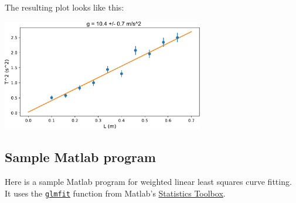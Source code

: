 \documentclass[11pt,a4paper]{article}
\begin{document}
The resulting plot looks like this:
\begin{center}
  \includegraphics[width=0.66\textwidth]{errorpy.pdf}
\end{center}

\subsection{Sample Matlab program}

Here is a sample Matlab program for weighted linear least squares
curve fitting.  It uses the
\href{https://www.mathworks.com/help/stats/glmfit.html}{\texttt{glmfit}}
function from Matlab's
\href{https://www.mathworks.com/help/stats/index.html}{Statistics
  Toolbox}.
\end{document}
